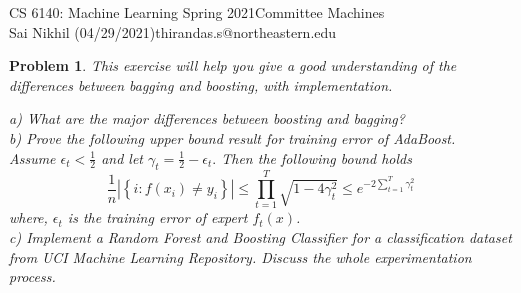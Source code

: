 \documentclass[12pt]{article}
\newtheorem{problem}{Problem}
\begin{document}
\noindent CS 6140: Machine Learning Spring 2021\hfill Committee Machines\\
Sai Nikhil (04/29/2021)\hfill thirandas.s@northeastern.edu

\hrulefill


\begin{problem}
This exercise will help you give a good understanding of the differences between bagging and boosting, with implementation.

a) What are the major differences between boosting and bagging?\\

b) Prove the following upper bound result for training error of AdaBoost.\\

Assume $\epsilon_{t}<\frac{1}{2}$ and let $\gamma_{t}=\frac{1}{2}-\epsilon_{t} .$ Then the following bound holds
$$
\frac{1}{n}\left|\left\{i: f\left(x_{i}\right) \neq y_{i}\right\}\right| \leq \prod_{t=1}^{T} \sqrt{1-4 \gamma_{t}^{2}} \leq e^{-2 \sum_{t=1}^{T} \gamma_{t}^{2}}
$$
where, $\epsilon_{t}$ is the training error of expert $f_t(x)$.\\

c) Implement a Random Forest and Boosting Classifier for a classification dataset from UCI Machine Learning Repository. Discuss the whole experimentation process.
\end{problem}
\end{document}
